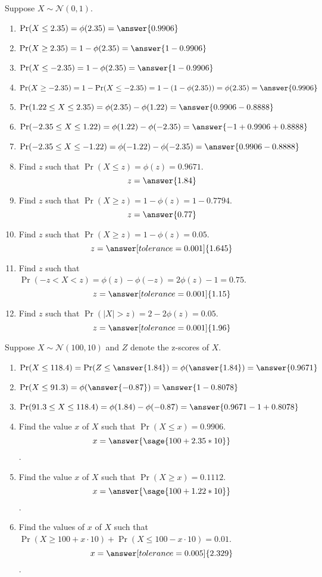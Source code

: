 \documentclass{ximera}
\begin{document}
\begin{problem}
Suppose $X\sim \mathcal N(0,1).$ 
\begin{enumerate}
\item $\Pr(X\leq 2.35)=\phi(2.35)=\answer{0.9906}$
\item $\Pr(X\geq 2.35)=1-\phi(2.35)=\answer{1-0.9906}$
\item $\Pr(X\leq -2.35)=1-\phi(2.35)=\answer{1-0.9906}$
\item $\Pr(X\geq -2.35)=1-\Pr(X\leq -2.35)=1-(1-\phi(2.35))=\phi(2.35)=\answer{0.9906}$
\item $\Pr(1.22\leq X\leq 2.35)=\phi(2.35)-\phi(1.22)=\answer{0.9906-0.8888}$
\item $\Pr(-2.35\leq X\leq 1.22)=\phi(1.22)-\phi(-2.35)=\answer{-1+0.9906+0.8888}$
\item $\Pr(-2.35\leq X\leq -1.22)=\phi(-1.22)-\phi(-2.35)=\answer{0.9906-0.8888}$
\item Find $z$ such that $\Pr(X\leq z)=\phi(z)={0.9671}$.
$$z=\answer{1.84}$$
\item Find $z$ such that $\Pr(X\geq z)=1-\phi(z)={1-0.7794}$.
$$z=\answer{0.77}$$
\item Find $z$ such that $\Pr(X\geq z)=1-\phi(z)={0.05}$.
$$z=\answer[tolerance=0.001]{1.645}$$
\item Find $z$ such that $\Pr(-z<X< z)=\phi(z)-\phi(-z)=2\phi(z)-1={0.75}$.
$$z=\answer[tolerance=0.001]{1.15}$$
\item Find $z$ such that $\Pr(|X|> z)=2-2\phi(z)={0.05}$.
$$z=\answer[tolerance=0.001]{1.96}$$

\end{enumerate}
\end{problem}

\begin{problem}
Suppose $X\sim \mathcal N(100,10)$ and $Z$ denote the z-scores of $X$. 
\begin{enumerate}
\item $\Pr(X\leq 118.4)=\Pr(Z\leq \answer{1.84})=\phi(\answer{1.84})=\answer{0.9671}$
\item $\Pr(X\leq 91.3)=\phi(\answer{-0.87})=\answer{1-0.8078}$
\item $\Pr(91.3\leq X\leq 118.4)=\phi(1.84)-\phi(-0.87)=\answer{0.9671-1+0.8078}$
\item Find the value $x$ of $X$ such that $\Pr(X\leq x)=0.9906$.
$$x=\answer{\sage{100+2.35*10}}$$.
\item Find the value $x$ of $X$ such that $\Pr(X\geq x)=0.1112$.
$$x=\answer{\sage{100+1.22*10}}$$.
\item Find the values of $x$ of $X$ such that $\Pr(X\geq 100+x\cdot 10)+\Pr(X\leq 100-x\cdot 10)=0.01$.
$$x=\answer[tolerance=0.005]{2.329}$$.
\end{enumerate}
\end{problem}
\end{document}
